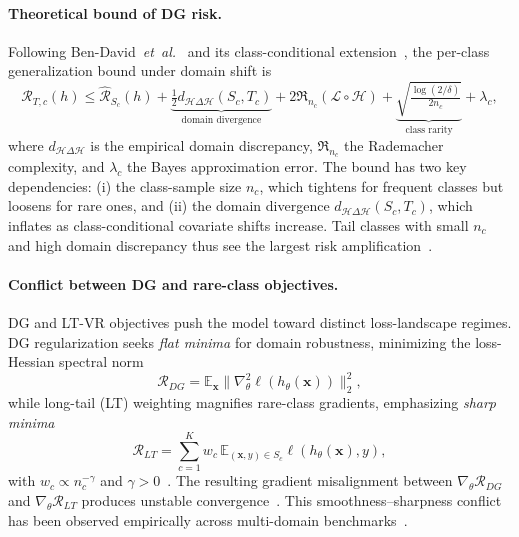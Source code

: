 \documentclass{article}
\newcommand{\etal}{\textit{et~al.}}
\begin{document}
\paragraph{Theoretical bound of DG risk.}
Following Ben-David~\etal~\cite{BenDavid10} and its class-conditional
extension~\cite{Yang22}, the per-class generalization bound under domain
shift is
\begin{equation}
\label{eq:classrisk}
\mathcal{R}_{T,c}(h) \le \widehat{\mathcal{R}}_{S_c}(h)
+ \underbrace{\tfrac{1}{2}d_{\mathcal{H}\Delta\mathcal{H}}(S_c, T_c)}_{\text{domain divergence}}
+ 2\mathfrak{R}_{n_c}(\mathcal{L}\circ\mathcal{H})
+ \underbrace{\sqrt{\tfrac{\log(2/\delta)}{2 n_c}}}_{\text{class rarity}}
+ \lambda_c,
\end{equation}
where $d_{\mathcal{H}\Delta\mathcal{H}}$ is the empirical domain
discrepancy, $\mathfrak{R}_{n_c}$ the Rademacher complexity, and
$\lambda_c$ the Bayes approximation error. The bound has two key
dependencies: (i) the class-sample size $n_c$, which tightens for frequent
classes but loosens for rare ones, and (ii) the domain divergence
$d_{\mathcal{H}\Delta\mathcal{H}}(S_c, T_c)$, which inflates as
class-conditional covariate shifts increase. Tail classes with small $n_c$
and high domain discrepancy thus see the largest risk
amplification~\cite{Yang22, Zhang21}.

\paragraph{Conflict between DG and rare-class objectives.}
DG and LT-VR objectives push the model toward distinct loss-landscape regimes.
DG regularization seeks \emph{flat minima} for domain robustness, minimizing
the loss-Hessian spectral norm
\begin{equation}
\mathcal{R}_{DG} = \mathbb{E}_{\mathbf{x}}\|\nabla^2_{\theta}\ell(h_{\theta}(\mathbf{x}))\|_2^2,
\end{equation}
while long-tail (LT) weighting magnifies rare-class gradients, emphasizing
\emph{sharp minima}
\begin{equation}
\mathcal{R}_{LT} = \sum_{c=1}^K w_c\, \mathbb{E}_{(\mathbf{x},y)\in S_c}\ell(h_{\theta}(\mathbf{x}), y),
\end{equation}
with $w_c \propto n_c^{-\gamma}$ and $\gamma > 0$~\cite{Cui19}. The
resulting gradient misalignment between $\nabla_{\theta}\mathcal{R}_{DG}$
and $\nabla_{\theta}\mathcal{R}_{LT}$ produces unstable
convergence~\cite{Su24}. This smoothness--sharpness conflict has been
observed empirically across multi-domain
benchmarks~\cite{Yang22, Su24a, Tang25, FRoundation25}.
\end{document}
